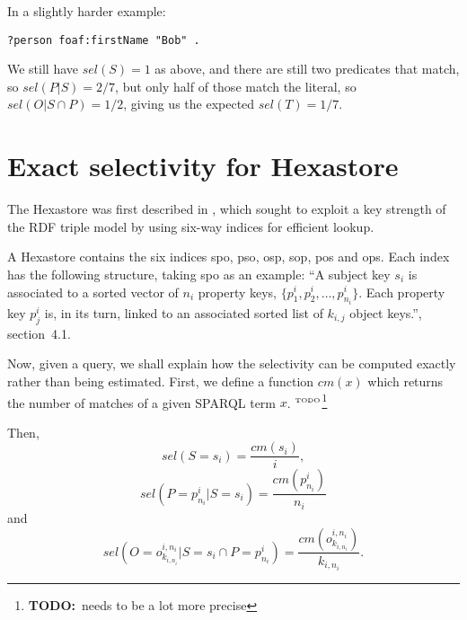 \documentclass[12pt, draft]{article}
\newcommand{\todo}[1]{\ensuremath{^{\textrm{\tiny{TODO}\normalsize}}}\footnote{\textbf{TODO:}~#1}}
\begin{document}
In a slightly harder example:
\begin{verbatim}
?person foaf:firstName "Bob" .
\end{verbatim}
We still have $sel(S) = 1$ as above, and there are still two
predicates that match, so $sel(P | S) = 2/7$, but only half of those
match the literal, so $sel(O | S \cap P) = 1/2$, giving us the
expected $sel(T) = 1/7$.

\section{Exact selectivity for Hexastore}

The Hexastore was first described in
\cite{Weiss:2008:HSI:1453856.1453965}, which sought to exploit a key
strength of the RDF triple model by using six-way indices for
efficient lookup.

A Hexastore contains the six indices \textsf{spo}, \textsf{pso},
\textsf{osp}, \textsf{sop}, \textsf{pos} and \textsf{ops}. Each index
has the following structure, taking \textsf{spo} as an example: ``A
subject key $s_i$ is associated to a sorted vector of $n_i$ property
keys, $\{p_1^i , p_2^i , \ldots , p^i_{n_i} \}$. Each property key $p_j^i$
is, in its turn, linked to an associated sorted list of $k_{i,j}$
object keys.''\cite{Weiss:2008:HSI:1453856.1453965}, section~4.1.

Now, given a query, we shall explain how the selectivity can be
computed exactly rather than being estimated. First, we define a
function $cm(x)$ which returns the number of matches of a given SPARQL
term $x$. \todo{needs to be a lot more precise}

Then, 
\begin{equation}
sel(S = s_i) = \frac{cm(s_i)}{i} ,
\end{equation}
\begin{equation}
sel(P = p_{n_i}^i|S = s_i) = \frac{cm(p_{n_i}^i)}{n_i}
\end{equation}
and
\begin{equation}
sel(O = o_{k_{i,n_i}}^{i,n_i} |S = s_i \cap P = p_{n_i}^i) =
\frac{cm(o_{k_{i,n_i}}^{i,n_i})}{k_{i,n_i}} .
\end{equation}





\end{document}
